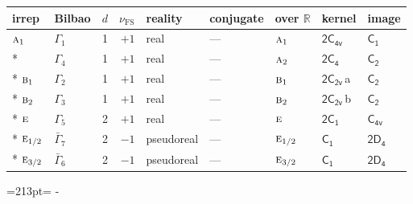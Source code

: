\documentclass[10pt,a4paper]{article}
\makeatletter
\def\grouprule#1#2{\noalign{\marks\LTgroupmarks{\the\belowrulesep}\nobreak\vskip#1%
  \vskip\aboverulesep}\multispan\LT@cols\unskip{\leaders\hrule\@height#2\hfill\kern\z@}\cr
  \noalign{\penalty\LTrulebreak\vskip\belowrulesep\global\@lastruleclass\z@}}
\newcommand{\needspace}[1]{\par\penalty-100\begingroup\dimen0=#1\relax\dimen2=\pagegoal
  \advance\dimen2-\pagetotal\ifdim\dimen0>\dimen2\relax\ifdim\dimen2>0pt\vfil\break\fi\fi
  \endgroup}
\numberwithin{equation}{section}
\newcommand{\grp}[1]{\mathsf{#1}}
\newcommand{\irr}[1]{\text{\normalfont\scshape #1}}
\newcommand{\detbox}[1]{{\setlength{\fboxsep}{1pt}\fbox{#1}}}
\newcommand{\clsletter}[1]{\,{\scriptsize\color{black!55}#1}}
\newcommand{\fsind}{\nu_{\mathrm{FS}}}
\makeatother
\begin{document}
\setlength{\emergencystretch}{2em}\par\setlength{\emergencystretch}{0pt}
{\small\renewcommand{\arraystretch}{1.25}\setlength{\tabcolsep}{4pt}\begin{longtable}{@{}llrrlllll@{}}\toprule
irrep & Bilbao & $d$ & $\fsind$ & reality & conjugate & over $\mathbb{R}$ & kernel & image\\\midrule\endhead
\bottomrule\endfoot\endlastfoot
$\irr{a}_{1}$ & $\Gamma_{1}$ & 1 & $+1$ & real & --- & $\irr{a}_{1}$ & \href{2C4v.pdf}{$\grp{2C_{4v}}$} & \href{../../../rotation/data/pdf/C1.pdf}{$\grp{C_{1}}$}\\*
\detbox{$\irr{a}_{2}$} & $\Gamma_{4}$ & 1 & $+1$ & real & --- & $\irr{a}_{2}$ & \href{2C4.pdf}{$\grp{2C_{4}}$} & \href{../../../rotation/data/pdf/C2.pdf}{$\grp{C_{2}}$}\\*
$\irr{b}_{1}$ & $\Gamma_{2}$ & 1 & $+1$ & real & --- & $\irr{b}_{1}$ & \href{2C2v.pdf}{$\grp{2C_{2v}}$}\clsletter{a} & \href{../../../rotation/data/pdf/C2.pdf}{$\grp{C_{2}}$}\\*
$\irr{b}_{2}$ & $\Gamma_{3}$ & 1 & $+1$ & real & --- & $\irr{b}_{2}$ & \href{2C2v.pdf}{$\grp{2C_{2v}}$}\clsletter{b} & \href{../../../rotation/data/pdf/C2.pdf}{$\grp{C_{2}}$}\\*
$\irr{e}$ & $\Gamma_{5}$ & 2 & $+1$ & real & --- & $\irr{e}$ & \href{2C1.pdf}{$\grp{2C_{1}}$} & \href{../../../rotation/data/pdf/C4v.pdf}{$\grp{C_{4v}}$}\\*
\grouprule{0pt}{\lightrulewidth}
$\irr{e}_{1/2}$ & $\bar{\Gamma}_{7}$ & 2 & $-1$ & pseudoreal & --- & $\irr{e}_{1/2}$ & \href{C1.pdf}{$\grp{C_{1}}$} & \href{2D4.pdf}{$\grp{2D_{4}}$}\\*
$\irr{e}_{3/2}$ & $\bar{\Gamma}_{6}$ & 2 & $-1$ & pseudoreal & --- & $\irr{e}_{3/2}$ & \href{C1.pdf}{$\grp{C_{1}}$} & \href{2D4.pdf}{$\grp{2D_{4}}$}\\
\bottomrule\end{longtable}}
\needspace{213pt}
\end{document}
